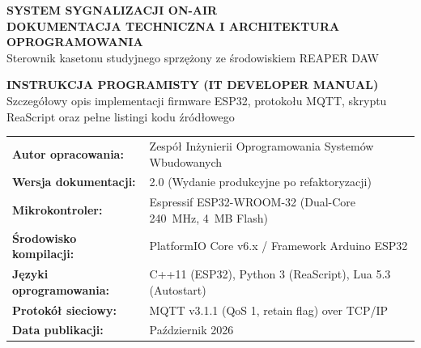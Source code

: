 \documentclass[11pt,a4paper]{article}
\begin{document}
\begin{titlepage}
    \centering
    \vspace*{1.5cm}
    
    {\Huge\bfseries\color{primaryBlue} SYSTEM SYGNALIZACJI ON-AIR}\\[0.4cm]
    {\LARGE\bfseries DOKUMENTACJA TECHNICZNA I ARCHITEKTURA OPROGRAMOWANIA}\\[0.3cm]
    {\large\color{gray} Sterownik kasetonu studyjnego sprzężony ze środowiskiem REAPER DAW}\\[1.5cm]
    
    \begin{tcolorbox}[colback=primaryBlue!5,colframe=primaryBlue,arc=4mm,width=0.9\textwidth,halign=center]
        \vspace{0.4cm}
        {\Large\bfseries INSTRUKCJA PROGRAMISTY (IT DEVELOPER MANUAL)}\\[0.2cm]
        {\normalsize Szczegółowy opis implementacji firmware ESP32, protokołu MQTT, skryptu ReaScript oraz pełne listingi kodu źródłowego}
        \vspace{0.4cm}
    \end{tcolorbox}
    
    \vfill
    
    \begin{tabularx}{0.88\textwidth}{l X}
        \textbf{Autor opracowania:} & Zespół Inżynierii Oprogramowania Systemów Wbudowanych \\
        \textbf{Wersja dokumentacji:} & 2.0 (Wydanie produkcyjne po refaktoryzacji) \\
        \textbf{Mikrokontroler:} & Espressif ESP32-WROOM-32 (Dual-Core 240~MHz, 4~MB Flash) \\
        \textbf{Środowisko kompilacji:} & PlatformIO Core v6.x / Framework Arduino ESP32 \\
        \textbf{Języki oprogramowania:} & C++11 (ESP32), Python 3 (ReaScript), Lua 5.3 (Autostart) \\
        \textbf{Protokół sieciowy:} & MQTT v3.1.1 (QoS 1, retain flag) over TCP/IP \\
        \textbf{Data publikacji:} & Październik 2026 \\
    \end{tabularx}
    
    \vspace{1cm}
\end{titlepage}
\end{document}
